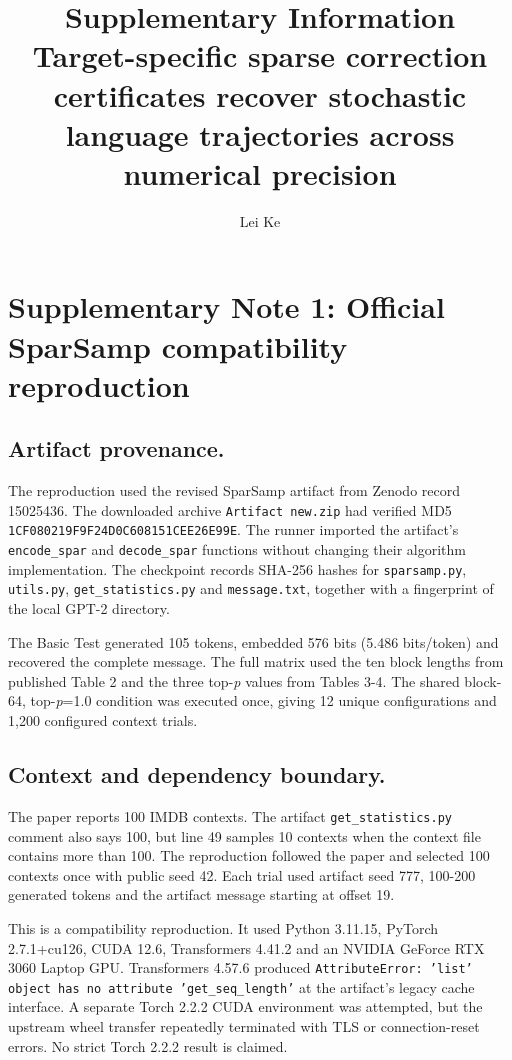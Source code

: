 \documentclass[11pt,a4paper]{article}
\title{\textbf{Supplementary Information}\\[4pt]\large Target-specific sparse correction certificates recover stochastic language trajectories across numerical precision}
\author{Lei Ke}
\date{}
\begin{document}
\maketitle


\section*{Supplementary Note 1: Official SparSamp compatibility reproduction}
\subsection{Artifact provenance.}
The reproduction used the revised SparSamp artifact from Zenodo record 15025436. The downloaded archive \texttt{Artifact \allowbreak{}new.\allowbreak{}zip} had verified MD5 \texttt{1CF080219F9F24D0C608151CEE26E99E}. The runner imported the artifact's \texttt{encode\_\allowbreak{}spar} and \texttt{decode\_\allowbreak{}spar} functions without changing their algorithm implementation. The checkpoint records SHA-256 hashes for \texttt{sparsamp.\allowbreak{}py}, \texttt{utils.\allowbreak{}py}, \texttt{get\_\allowbreak{}statistics.\allowbreak{}py} and \texttt{message.\allowbreak{}txt}, together with a fingerprint of the local GPT-2 directory.

The Basic Test generated 105 tokens, embedded 576 bits (5.486 bits/token) and recovered the complete message. The full matrix used the ten block lengths from published Table 2 and the three top-\textit{p} values from Tables 3-4. The shared block-64, top-\textit{p}=1.0 condition was executed once, giving 12 unique configurations and 1,200 configured context trials.

\subsection{Context and dependency boundary.}
The paper reports 100 IMDB contexts. The artifact \texttt{get\_\allowbreak{}statistics.\allowbreak{}py} comment also says 100, but line 49 samples 10 contexts when the context file contains more than 100. The reproduction followed the paper and selected 100 contexts once with public seed 42. Each trial used artifact seed 777, 100-200 generated tokens and the artifact message starting at offset 19.

This is a compatibility reproduction. It used Python 3.11.15, PyTorch 2.7.1+cu126, CUDA 12.6, Transformers 4.41.2 and an NVIDIA GeForce RTX 3060 Laptop GPU. Transformers 4.57.6 produced \texttt{AttributeError:\allowbreak{} \allowbreak{}'list' \allowbreak{}object \allowbreak{}has \allowbreak{}no \allowbreak{}attribute \allowbreak{}'get\_\allowbreak{}seq\_\allowbreak{}length'} at the artifact's legacy cache interface. A separate Torch 2.2.2 CUDA environment was attempted, but the upstream wheel transfer repeatedly terminated with TLS or connection-reset errors. No strict Torch 2.2.2 result is claimed.
\end{document}
